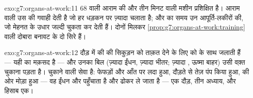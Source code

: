 \begin{solution}{exo:g7:organs-at-work:11}
$68$ वाली आराम की  और तीन मिनट वाली मशीन प्रशिक्षित है। आराम वाली
 उस  की गवाही देती है जो हर धड़कन पर ज़्यादा चलाता है; और 
का समय उन आपूर्ति-लकीरों की, जो मेहनत के उधार जल्दी चुकता कर देती हैं।
दोनों मिलकर \cref{prop:g7:organs-at-work:training} वाली दोबारा बनावट के
दो सिरे हैं।
\end{solution}

\begin{solution}{exo:g7:organs-at-work:12}
दौड़ में  की  की  सिकुड़न को ताक़त देने के लिए
 को  के साथ जलाती हैं --- यही  का मक़सद है --- और
उनका बिल (ज़्यादा ईंधन, ज़्यादा  भीतर; ज़्यादा , ऊष्मा बाहर) उसी वक़्त चुकाना पड़ता है। चुकाने वाली सेवा 
है: फेफड़ों और आँत पर लदा हुआ, दौड़ते  से तेज़ पंप किया हुआ, 
की ओर मोड़ा हुआ --- वह ईंधन और  पहुँचाता है और 
ढोकर ले जाता है --- एक दौड़, तीन अध्याय, और हिसाब एक।
\end{solution}


